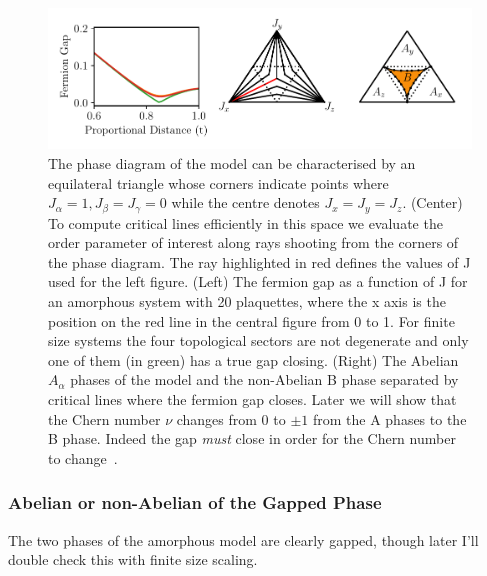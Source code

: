 \hypertarget{fig:phase_diagram}{%
\begin{figure}
\centering
\includegraphics[width=1\textwidth,height=\textheight]{figure_code/amk_chapter/results/phase_diagram/phase_diagram}
\caption[{The Ground State Phase Diagram}]{The phase diagram of the model can be characterised by an equilateral triangle whose corners indicate points where \(J_\alpha = 1, J_\beta = J_\gamma = 0\) while the centre denotes \(J_x = J_y = J_z\). (Center) To compute critical lines efficiently in this space we evaluate the order parameter of interest along rays shooting from the corners of the phase diagram. The ray highlighted in red defines the values of J used for the left figure. (Left) The fermion gap as a function of J for an amorphous system with 20 plaquettes, where the x axis is the position on the red line in the central figure from 0 to 1. For finite size systems the four topological sectors are not degenerate and only one of them (in green) has a true gap closing. (Right) The Abelian \(A_\alpha\) phases of the model and the non-Abelian B phase separated by critical lines where the fermion gap closes. Later we will show that the Chern number \(\nu\) changes from \(0\) to \(\pm 1\) from the A phases to the B phase. Indeed the gap \emph{must} close in order for the Chern number to change~\autocite{ezawaTopologicalPhaseTransition2013}.}
\label{fig:phase_diagram}
\end{figure}
}

\hypertarget{abelian-or-non-abelian-of-the-gapped-phase}{%
\subsubsection{Abelian or non-Abelian of the Gapped Phase}\label{abelian-or-non-abelian-of-the-gapped-phase}}

The two phases of the amorphous model are clearly gapped, though later I'll double check this with finite size scaling.

